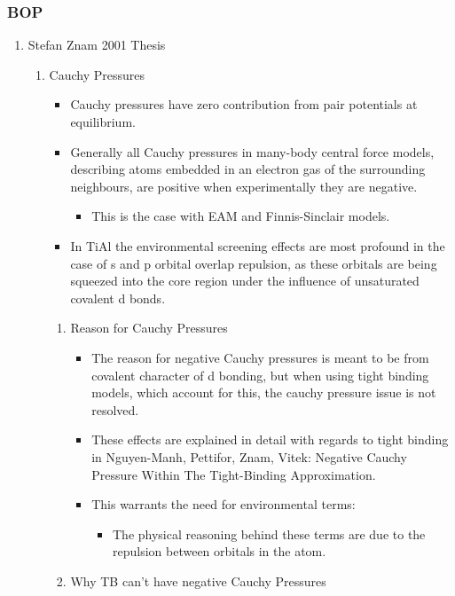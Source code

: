 \documentclass[11pt]{article}
\begin{document}
\subsubsection{BOP}
\label{sec:org3f74788}
\begin{enumerate}
\item Stefan Znam 2001 Thesis
\label{sec:org8bd8fa1}
\begin{enumerate}
\item Cauchy Pressures
\label{sec:orge3c6560}
\begin{itemize}
\item Cauchy pressures have zero contribution from pair potentials at
equilibrium.
\item Generally all Cauchy pressures in many-body central force models,
describing atoms embedded in an electron gas of the surrounding
neighbours, are positive when experimentally they are negative.
\begin{itemize}
\item This is the case with EAM and Finnis-Sinclair models.
\end{itemize}
\item In TiAl the environmental screening effects are most profound in the
case of s and p orbital overlap repulsion, as these orbitals are being
squeezed into the core region under the influence of unsaturated
covalent d bonds.
\end{itemize}
\begin{enumerate}
\item Reason for Cauchy Pressures
\label{sec:org248ee23}
\begin{itemize}
\item The reason for negative Cauchy pressures is meant to be from covalent
character of d bonding, but when using tight binding models, which
account for this, the cauchy pressure issue is not resolved.
\item These effects are explained in detail with regards to tight binding in
Nguyen-Manh, Pettifor, Znam, Vitek: Negative Cauchy Pressure Within
The Tight-Binding Approximation.
\item This warrants the need for environmental terms:
\begin{itemize}
\item The physical reasoning behind these terms are due to the repulsion
between orbitals in the atom.
\end{itemize}
\end{itemize}
\item Why TB can't have negative Cauchy Pressures

\end{enumerate}
\end{enumerate}
\end{enumerate}
\end{document}

